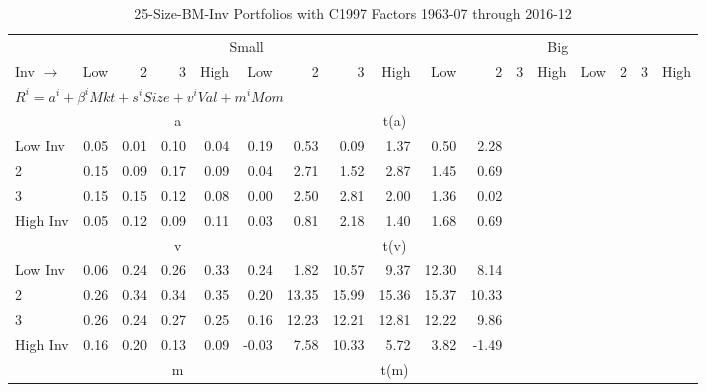 
\begin{table}[!ht]
\centering
\caption{25-Size-BM-Inv Portfolios with C1997 Factors 1963-07 through 2016-12}
\begin{tabular}{lrrrrrrrrrrrrrrrr}
  \toprule
    & \multicolumn{8}{c}{Small} & \multicolumn{8}{c}{Big} \\
      \cmidrule(r){2-9} \cmidrule(r){10-17}
    Inv $\rightarrow$ & Low & 2 & 3 & High & Low & 2 & 3 & High & Low & 2 & 3 & High & Low & 2 & 3 & High \\ 
  \midrule
  \multicolumn{11}{l}{$R^i=a^i+\beta^iMkt+s^iSize+v^iVal+m^iMom$} \\

  
    
      & \multicolumn{5}{c}{a} & \multicolumn{5}{c}{t(a)}
    
    \\
      \cmidrule(r){2-5} \cmidrule(r){6-9} \cmidrule(r){10-13} \cmidrule(r){14-17}

    Low Inv   & 0.05  & 0.01  & 0.10  & 0.04  & 0.19  & 0.53  & 0.09  & 1.37  & 0.50  & 2.28  \\
           2  & 0.15  & 0.09  & 0.17  & 0.09  & 0.04  & 2.71  & 1.52  & 2.87  & 1.45  & 0.69  \\
           3  & 0.15  & 0.15  & 0.12  & 0.08  & 0.00  & 2.50  & 2.81  & 2.00  & 1.36  & 0.02  \\
    High Inv  & 0.05  & 0.12  & 0.09  & 0.11  & 0.03  & 0.81  & 2.18  & 1.40  & 1.68  & 0.69  \\

  
    
      & \multicolumn{5}{c}{v} & \multicolumn{5}{c}{t(v)}
    
    \\
      \cmidrule(r){2-5} \cmidrule(r){6-9} \cmidrule(r){10-13} \cmidrule(r){14-17}

    Low Inv   & 0.06  & 0.24  & 0.26  & 0.33  & 0.24  & 1.82  & 10.57  & 9.37  & 12.30  & 8.14  \\
           2  & 0.26  & 0.34  & 0.34  & 0.35  & 0.20  & 13.35  & 15.99  & 15.36  & 15.37  & 10.33  \\
           3  & 0.26  & 0.24  & 0.27  & 0.25  & 0.16  & 12.23  & 12.21  & 12.81  & 12.22  & 9.86  \\
    High Inv  & 0.16  & 0.20  & 0.13  & 0.09  & -0.03  & 7.58  & 10.33  & 5.72  & 3.82  & -1.49  \\

  
    
      & \multicolumn{5}{c}{m} & \multicolumn{5}{c}{t(m)}
    

\end{tabular}
\end{table}

